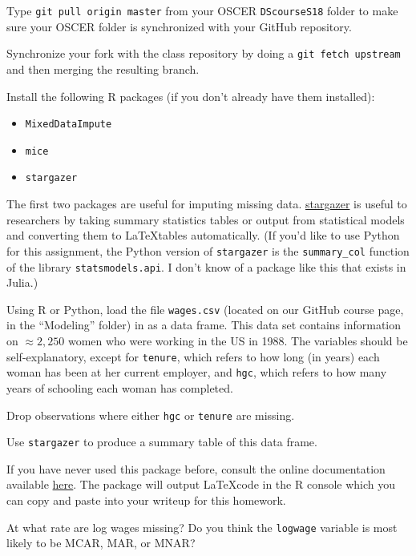 \documentclass[12pt,english]{exam}
\begin{document}
\begin{questions}
\question Type \texttt{git pull origin master} from your OSCER \texttt{DScourseS18} folder to make sure your OSCER folder is synchronized with your GitHub repository. 

\question Synchronize your fork with the class repository by doing a \texttt{git fetch upstream} and then merging the resulting branch. 

\question Install the following R packages (if you don't already have them installed):
\begin{itemize}
    \item \texttt{MixedDataImpute}
    \item \texttt{mice}
    \item \texttt{stargazer}
\end{itemize}

The first two packages are useful for imputing missing data.
\href{https://cran.r-project.org/web/packages/stargazer/vignettes/stargazer.pdf}{stargazer} is useful to researchers by taking summary statistics tables or output from statistical models and converting them to \LaTeX tables automatically. (If you'd like to use Python for this assignment, the Python version of \texttt{stargazer} is the \texttt{summary\_col} function of the library \texttt{statsmodels.api}. I don't know of a package like this that exists in Julia.)

\question Using R or Python, load the file \texttt{wages.csv} (located on our GitHub course page, in the ``Modeling'' folder) in as a data frame. This data set contains information on $\approx 2,250$ women who were working in the US in 1988. The variables should be self-explanatory, except for \texttt{tenure}, which refers to how long (in years) each woman has been at her current employer, and \texttt{hgc}, which refers to how many years of schooling each woman has completed.

\question Drop observations where either \texttt{hgc} or \texttt{tenure} are missing.

\question Use \texttt{stargazer} to produce a summary table of this data frame.

If you have never used this package before, consult the online documentation available \href{https://cran.r-project.org/web/packages/stargazer/vignettes/stargazer.pdf}{here}. The package will output \LaTeX code in the R console which you can copy and paste into your writeup for this homework. 

At what rate are log wages missing? Do you think the \texttt{logwage} variable is most likely to be MCAR, MAR, or MNAR?


\end{questions}
\end{document}
